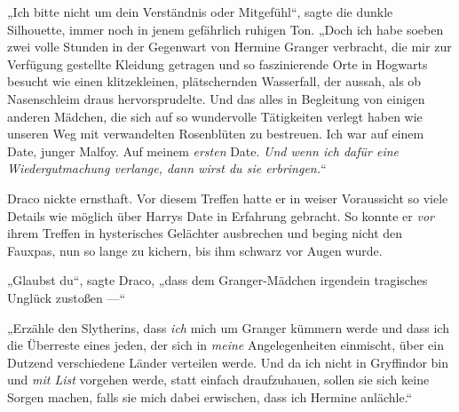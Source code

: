 „Ich bitte nicht um dein Verständnis oder Mitgefühl“, sagte die dunkle Silhouette, immer noch in jenem gefährlich ruhigen Ton.
„Doch ich habe soeben zwei volle Stunden in der Gegenwart von Hermine Granger verbracht, die mir zur Verfügung gestellte Kleidung getragen und so faszinierende Orte in Hogwarts besucht wie einen klitzekleinen, plätschernden Wasserfall, der aussah, als ob Nasenschleim draus hervorsprudelte. Und das alles in Begleitung von einigen anderen Mädchen, die sich auf so wundervolle Tätigkeiten verlegt haben wie unseren Weg mit verwandelten Rosenblüten zu bestreuen. Ich war auf einem Date, junger Malfoy. Auf meinem \emph{ersten} Date. \emph{Und wenn ich dafür eine Wiedergutmachung verlange, dann wirst du sie erbringen.}“

Draco nickte ernsthaft. Vor diesem Treffen hatte er in weiser Voraussicht so viele Details wie möglich über Harrys Date in Erfahrung gebracht. So konnte er \emph{vor} ihrem Treffen in hysterisches Gelächter ausbrechen und beging nicht den Fauxpas, nun so lange zu kichern, bis ihm schwarz vor Augen wurde.

„Glaubst du“, sagte Draco, „dass dem Granger-Mädchen irgendein tragisches Unglück zustoßen —“

„Erzähle den Slytherins, dass \emph{ich} mich um Granger kümmern werde und dass ich die Überreste eines jeden, der sich in \emph{meine} Angelegenheiten einmischt, über ein Dutzend verschiedene Länder verteilen werde. Und da ich nicht in Gryffindor bin und \emph{mit List} vorgehen werde, statt einfach draufzuhauen, sollen sie sich keine Sorgen machen, falls sie mich dabei erwischen, dass ich Hermine anlächle.“

